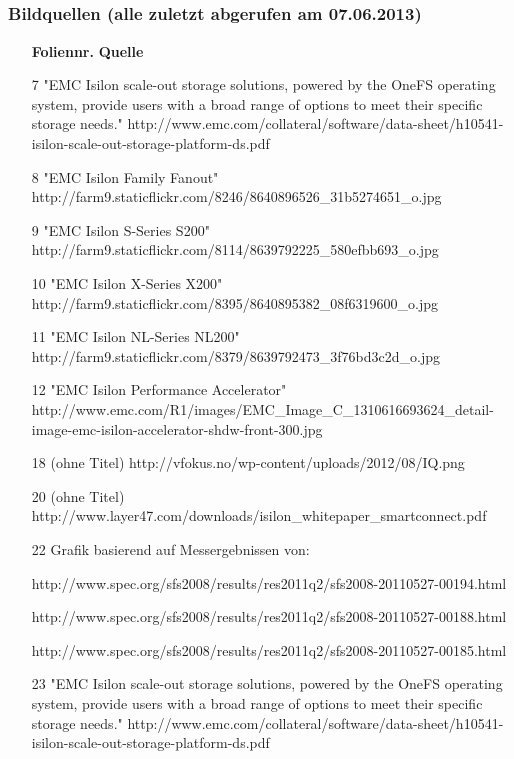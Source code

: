 \documentclass{beamer}
\begin{document}
\subsection{}
\begin{frame}[fragile]
  \frametitle{Bildquellen (alle zuletzt abgerufen am 07.06.2013)}

  \tiny
  \begin{itemize}
    \item[\textbf{Foliennr.}] \textbf{Quelle}
    \item[7] "EMC Isilon scale-out storage solutions, powered by the OneFS operating system, provide users with a broad range of options to meet their specific storage needs." http://www.emc.com/collateral/software/data-sheet/h10541-isilon-scale-out-storage-platform-ds.pdf
    \item[8] "EMC Isilon Family Fanout" http://farm9.staticflickr.com/8246/8640896526\_31b5274651\_o.jpg
    \item[9] "EMC Isilon S-Series S200" http://farm9.staticflickr.com/8114/8639792225\_580efbb693\_o.jpg
    \item[10] "EMC Isilon X-Series X200" http://farm9.staticflickr.com/8395/8640895382\_08f6319600\_o.jpg
    \item[11] "EMC Isilon NL-Series NL200" http://farm9.staticflickr.com/8379/8639792473\_3f76bd3c2d\_o.jpg 
    \item[12] "EMC Isilon Performance Accelerator" http://www.emc.com/R1/images/EMC\_Image\_C\_1310616693624\_detail-image-emc-isilon-accelerator-shdw-front-300.jpg
    \item[18] (ohne Titel) http://vfokus.no/wp-content/uploads/2012/08/IQ.png
    \item[20] (ohne Titel) http://www.layer47.com/downloads/isilon\_whitepaper\_smartconnect.pdf
    \item[22] Grafik basierend auf Messergebnissen von:
    \item[] http://www.spec.org/sfs2008/results/res2011q2/sfs2008-20110527-00194.html
    \item[] http://www.spec.org/sfs2008/results/res2011q2/sfs2008-20110527-00188.html
    \item[] http://www.spec.org/sfs2008/results/res2011q2/sfs2008-20110527-00185.html
    \item[23] "EMC Isilon scale-out storage solutions, powered by the OneFS operating system, provide users with a broad range of options to meet their specific storage needs." http://www.emc.com/collateral/software/data-sheet/h10541-isilon-scale-out-storage-platform-ds.pdf 
  \end{itemize}
  
\end{frame}
\end{document}
